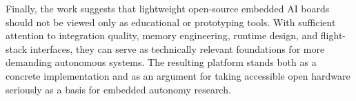 Finally, the work suggests that lightweight open-source embedded AI
boards should not be viewed only as educational or prototyping tools.
With sufficient attention to integration quality, memory engineering,
runtime design, and flight-stack interfaces, they can serve as
technically relevant foundations for more demanding autonomous systems.
The resulting platform stands both as a concrete implementation and as
an argument for taking accessible open hardware seriously as a basis for
embedded autonomy research.
